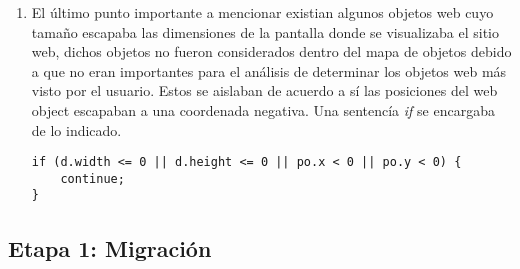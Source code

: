 \begin{enumerate}
		\item El último punto importante a mencionar existian algunos objetos web cuyo tamaño 
		escapaba las dimensiones de la pantalla donde se visualizaba el sitio web, dichos objetos
		no fueron considerados dentro del mapa de objetos debido a que no eran importantes 
		para el análisis de determinar los objetos web más visto por el usuario. Estos 
		se aislaban de acuerdo a sí las posiciones del web object escapaban a una coordenada
		negativa. Una sentencía \textit{if} se encargaba de lo indicado. 
		\begin{lstlisting}[style=Java, caption={Condición de borde.}]
if (d.width <= 0 || d.height <= 0 || po.x < 0 || po.y < 0) {
	continue;
}
\end{lstlisting}
        \end{enumerate}
        
	\subsection{Etapa 1: Migración}
	
